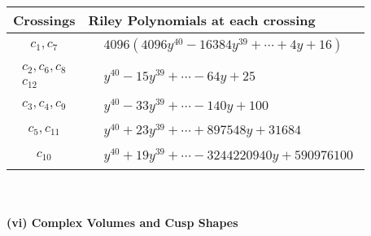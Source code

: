 \documentclass[1p]{elsarticle_modified}
\theoremstyle{definition}
\begin{document}
\begin{tabular}{m{50pt}|m{274pt}}
Crossings & \hspace{64pt}Riley Polynomials at each crossing \\
\hline $$\begin{aligned}c_{1},c_{7}\end{aligned}$$&$\begin{aligned}
&4096(4096 y^{40}-16384 y^{39}+\cdots+4 y+16)
\end{aligned}$\\
\hline $$\begin{aligned}c_{2},c_{6},c_{8}\\c_{12}\end{aligned}$$&$\begin{aligned}
&y^{40}-15 y^{39}+\cdots-64 y+25
\end{aligned}$\\
\hline $$\begin{aligned}c_{3},c_{4},c_{9}\end{aligned}$$&$\begin{aligned}
&y^{40}-33 y^{39}+\cdots-140 y+100
\end{aligned}$\\
\hline $$\begin{aligned}c_{5},c_{11}\end{aligned}$$&$\begin{aligned}
&y^{40}+23 y^{39}+\cdots+897548 y+31684
\end{aligned}$\\
\hline $$\begin{aligned}c_{10}\end{aligned}$$&$\begin{aligned}
&y^{40}+19 y^{39}+\cdots-3244220940 y+590976100
\end{aligned}$\\
\hline
\end{tabular}\\~\\
\newpage\flushleft \textbf{(vi) Complex Volumes and Cusp Shapes}
\end{document}

